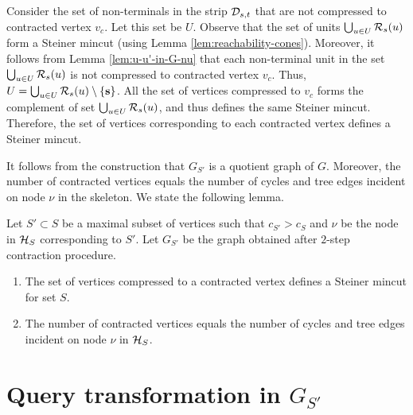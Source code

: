 
Consider the set of non-terminals in the strip ${\cal D}_{s,t}$ that are not compressed to contracted vertex $v_c$. Let this set be $U$. Observe that the set of units $\bigcup_{u\in U} {\cal R}_s(u)$ form a Steiner mincut (using Lemma \ref{lem:reachability-cones}). Moreover, it follows from Lemma \ref{lem:u-u'-in-G-nu} that each non-terminal unit in the set $\bigcup_{u\in U} {\cal R}_s(u)$ is not compressed to contracted vertex $v_c$. Thus, $U = \bigcup_{u\in U} {\cal R}_s(u) \setminus \{\mathbf{s}\}$. All the set of vertices compressed to $v_c$ forms the complement of set $\bigcup_{u\in U} {\cal R}_s(u)$, and thus defines the same Steiner mincut. Therefore, the set of vertices corresponding to each contracted vertex defines a Steiner mincut.

It follows from the construction that $G_{S'}$ is a quotient graph of $G$. Moreover, the number of contracted vertices equals the number of cycles and tree edges incident on node $\nu$ in the skeleton.  We state the following lemma.





\begin{lemma}
Let $S'\subset S$ be a maximal subset of vertices such that $c_{S'}>c_S$ and $\nu$ be the node in ${\cal H}_S$ corresponding to $S'$. Let $G_{S'}$ be the graph obtained after %
$2$-step contraction procedure. 
\begin{enumerate}
    \item The set of vertices compressed to a contracted vertex defines a Steiner mincut for set $S$.
    \item The number of contracted vertices equals the number of cycles and tree edges incident on node $\nu$ in ${\cal H}_S$.
\end{enumerate}
\label{lem:contracted-subcactus-mincut}
\end{lemma}


\vspace{-8mm}
\section{Query transformation in \texorpdfstring{$G_{S'}$}{compact graph}}

